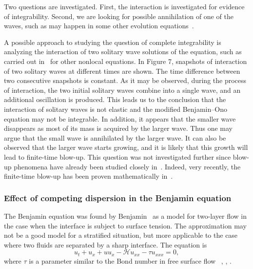 Two questions are investigated. First, the interaction is investigated for evidence
of integrability. Second, we are looking for possible annihilation of one of the waves,
such as may happen in some other evolution equations~\cite{Tjon1979}.



A possible approach to studying the question of complete integrability
is analyzing the interaction of two solitary wave solutions of the equation, 
such as carried out in~\cite{Kalisch2005,Kalisch2000} for other nonlocal equations.	
In Figure 7, snapshots of interaction of two solitary waves at different times are shown.
The time difference between two consecutive snapshots is constant.    
As it may be observed, during the process of interaction, the two initial solitary waves combine 
into a single wave, and an additional oscillation is produced. 
This leads us to the conclusion that the interaction of solitary waves is not elastic 
and the modified Benjamin--Ono equation may not be integrable. 
In addition, it appears that the smaller wave disappears as most of its
mass is acquired by the larger wave. Thus one may argue that the small
wave is annihilated by the larger wave. It can also be observed that
the larger wave starts growing, and it is likely that this growth
will lead to finite-time blow-up. This question was not investigated further
since blow-up phenomena have already been studied closely in~\cite{Kalisch2000}.
Indeed, very recently, the finite-time blow-up 
has been proven mathematically in~\cite{Martel2016}.





\subsubsection{Effect of competing dispersion in the Benjamin equation}
\label{Benjamin_eq}
The Benjamin equation was found by Benjamin~\cite{Benjamin1992} as a model for two-layer flow in the case
when the interface is subject to surface tension. The approximation may not be a good model for
a stratified situation, but more applicable to the case where two fluids are separated by a
sharp interface. 
The equation is 
\begin{equation}\label{benjamin}
u_t + u_x + uu_x - \mathcal{H} u_{xx} - \tau u_{xxx} = 0,
\end{equation}
where $\tau$ is a parameter similar to the Bond number in free surface flow~
\cite{Benjamin1992}, \cite{Kalisch2007}, \cite{Walsh2014}.
	
